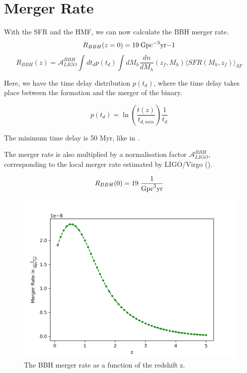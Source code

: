 \section{Merger Rate}

With the SFR and the HMF, we can now calculate the BBH merger rate.
\begin{equation}
    R_{BBH}(z=0) = 19 \:\rm{Gpc}^{-3}\rm{yr}{-1}
\end{equation}
\begin{equation}
    R_{BBH}(z)=\mathcal{A}_{LIGO}^{BBH}\int dt_d p(t_d) \int dM_h \frac{dn}{dM_h}(z_f, M_h)\langle SFR(M_h, z_f)\rangle_{SF}
    \label{BBH_merger_equation}
\end{equation}

Here, we have the time delay distribution $p(t_d)$, where the time delay takes place between the formation and the merger of the binary. 

\begin{equation}
    p(t_d)=\ln\left(\frac{t(z)}{t_{d, min}}\right)\frac{1}{t_d}
\end{equation}

The minimum time delay is 50 Myr, like in \cite{dallarmi_dipole_2022}. 

The merger rate is also multiplied by a normalisation factor $\mathcal{A}_{LIGO}^{BBH}$, corresponding to the local merger rate estimated by LIGO/Virgo (\cite{the_ligo_scientific_collaboration_population_2022}).

\begin{equation}
    R_{BBH}(0)=19 \; \frac{1}{\rm{Gpc}^3\rm{yr}}
\end{equation}

\begin{figure}
    \centering
    \includegraphics[width=0.9\linewidth]{Images/bbh_merger_rate.png}
    \caption{The BBH merger rate as a function of the redshift z.}
    \label{bbh_merger_rate}
\end{figure} 


